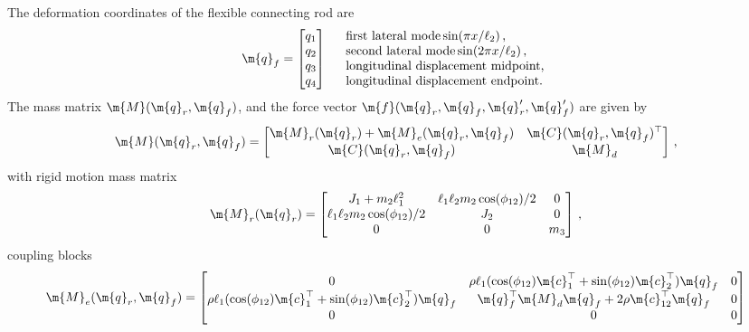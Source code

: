 %
The deformation coordinates of the flexible connecting rod are
%
\begin{equation*}
  \m{q}_{f}^{\phantom{\prime}} = \begin{bmatrix}
    q_1 \\
    q_2 \\
    q_3 \\
    q_4
  \end{bmatrix} \quad \begin{array}{l}
    \text{first lateral mode} \sin(\pi x/\ell_2) \, \text{,} \\
    \text{second lateral mode} \sin(2\pi x/\ell_2) \, \text{,} \\
    \text{longitudinal displacement midpoint,} \\
    \text{longitudinal displacement endpoint.}
  \end{array}
\end{equation*}
%
The mass matrix $\m{M}(\m{q}_{r}, \m{q}_{f}^{\phantom{\prime}})$, and the force vector $\m{f}(\m{q}_{r}, \m{q}_{f}^{\phantom{\prime}}, \m{q}_{r}^\prime, \m{q}_{f}^\prime)$ are given by
%
\begin{equation*}
  \m{M}(\m{q}_{r}, \m{q}_{f}^{\phantom{\prime}}) = \begin{bmatrix}
    \m{M}_r(\m{q}_{r}) + \m{M}_e(\m{q}_{r}, \m{q}_{f}^{\phantom{\prime}}) & \m{C}(\m{q}_{r}, \m{q}_{f}^{\phantom{\prime}})^\top \\
    \m{C}(\m{q}_{r}, \m{q}_{f}^{\phantom{\prime}})                    & \m{M}_{d}
  \end{bmatrix} \, \text{,}
\end{equation*}
%
with rigid motion mass matrix
%
\begin{equation*}
  \m{M}_r(\m{q}_{r}) = \begin{bmatrix}
    J_1+m_2 \ell_1^2 & \ell_1 \ell_2 m_2 \cos(\phi_{12})/2 & 0 \\
    \ell_1 \ell_2 m_2 \cos(\phi_{12})/2 & J_2 & 0 \\
    0 & 0 & m_3
  \end{bmatrix} \, \text{,}
\end{equation*}
%
coupling blocks
%
\begin{equation*}
  \m{M}_e(\m{q}_{r}, \m{q}_{f}^{\phantom{\prime}}) = \begin{bmatrix}
    0 & \rho \ell_1(\cos(\phi_{12})\m{c}_1^\top + \sin(\phi_{12})\m{c}_2^\top) \m{q}_{f}^{\phantom{\prime}} & 0 \\
    \rho \ell_1(\cos(\phi_{12})\m{c}_1^\top + \sin(\phi_{12})\m{c}_2^\top) \m{q}_{f}^{\phantom{\prime}} & \m{q}_{f}^\top\m{M}_{d}\m{q}_{f}^{\phantom{\prime}} + 2\rho\m{c}_{12}^\top\m{q}_{f}^{\phantom{\prime}} & 0 \\
    0 & 0 & 0
  \end{bmatrix}
\end{equation*}
